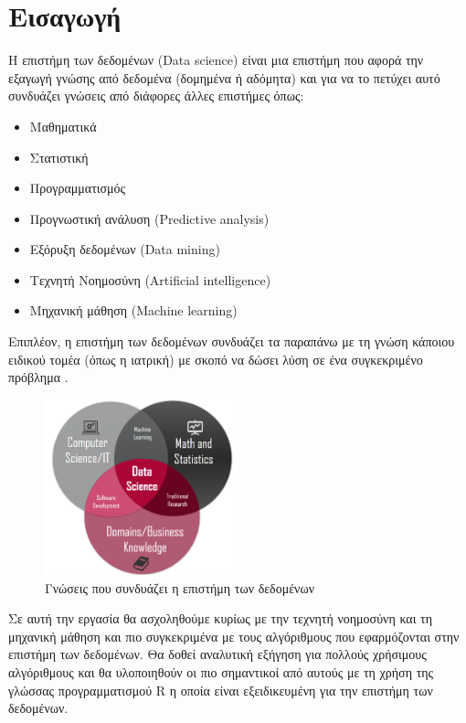 \newpage
\section{Εισαγωγή}
Η επιστήμη των δεδομένων (\textlatin{Data science}) είναι
μια επιστήμη που αφορά την εξαγωγή γνώσης από δεδομένα 
(δομημένα ή αδόμητα) και για να το πετύχει αυτό συνδυάζει 
γνώσεις από διάφορες άλλες επιστήμες όπως:
\begin{itemize}
    \item Μαθηματικά
    \item Στατιστική
    \item Προγραμματισμός
    \item Προγνωστική ανάλυση (\textlatin{Predictive analysis})
    \item Εξόρυξη δεδομένων (\textlatin{Data mining})
    \item Τεχνητή Νοημοσύνη (\textlatin{Artificial intelligence})
    \item Μηχανική μάθηση (\textlatin{Machine learning})
\end{itemize}
Επιπλέον, η επιστήμη των δεδομένων συνδυάζει τα παραπάνω με
τη γνώση κάποιου ειδικού τομέα (όπως η ιατρική) με σκοπό να
δώσει λύση σε ένα συγκεκριμένο πρόβλημα \cite{wikiDS}.
\begin{figure}[H]
    \centering
    \includegraphics[width=0.5\textwidth]{images/dataScienceKnowledge.png}
    \caption{Γνώσεις που συνδυάζει η επιστήμη των δεδομένων}
\end{figure}

Σε αυτή την εργασία θα ασχοληθούμε κυρίως με την τεχνητή
νοημοσύνη και τη μηχανική μάθηση και πιο συγκεκριμένα με τους
αλγόριθμους που εφαρμόζονται στην επιστήμη των δεδομένων.
Θα δοθεί αναλυτική εξήγηση για πολλούς χρήσιμους αλγόριθμους
και θα υλοποιηθούν οι πιο σημαντικοί από αυτούς με τη χρήση
της γλώσσας προγραμματισμού \textlatin{R} η οποία είναι 
εξειδικευμένη για την επιστήμη των δεδομένων.

